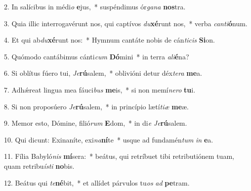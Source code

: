 2. In salícibus in médi\textit{o} \textbf{e}jus,~*  suspéndimus ór\textit{ga}\textit{na} \textbf{nos}tra.\

3. Quia illic interrogavérunt nos, qui captívos \textit{du}\textbf{xé}runt nos,~*  verba \textit{can}\textit{ti}\textbf{ó}num.\

4. Et qui ab\textit{du}\textbf{xé}runt nos:~*  Hymnum cantáte nobis de cán\textit{ti}\textit{cis} \textbf{Si}on.\

5. Quómodo cantábimus cánti\textit{cum} \textbf{Dó}mini~*  in terra \textit{a}\textit{li}\textbf{é}na?\

6. Si oblítus fúero tui, \textit{Je}\textbf{rú}salem,~*  oblivióni detur déx\textit{te}\textit{ra} \textbf{me}a.\

7. Adhǽreat lingua mea fáuci\textit{bus} \textbf{me}is,~*  si non memí\textit{ne}\textit{ro} \textbf{tu}i.\

8. Si non proposúero \textit{Je}\textbf{rú}salem,~*  in princípio lætí\textit{ti}\textit{æ} \textbf{me}æ.\

9. Memor esto, Dómine, filió\textit{rum} \textbf{E}dom,~*  in di\textit{e} \textit{Je}\textbf{rú}salem.\

10. Qui dicunt: Exinaníte, exi\textit{na}\textbf{ní}te~*  usque ad fundamén\textit{tum} \textit{in} \textbf{e}a.\

11. Fília Babyló\textit{nis} \textbf{mí}sera:~*  beátus, qui retríbuet tibi retributiónem tuam, quam retribu\textit{ís}\textit{ti} \textbf{no}bis.\

12. Beátus qui \textit{te}\textbf{né}bit,~*  et allídet párvulos tu\textit{os} \textit{ad} \textbf{pe}tram.\

